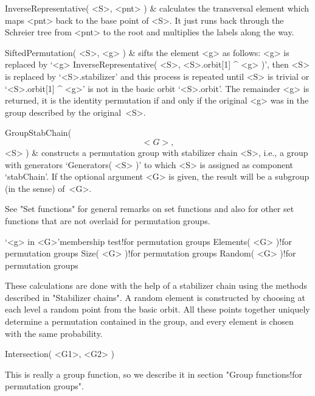 \function InverseRepresentative( <S>, <pnt> ) &
        calculates the transversal element which  maps <pnt> back to  the
        base point of  <S>. It just  runs back through the  Schreier tree
        from <pnt> to the root and multiplies the labels along the way.

\function SiftedPermutation( <S>, <g> ) &
        sifts  the element  <g> as  follows: <g>  is replaced by  `<g> \*
        InverseRepresentative(  <S>, <S>.orbit[1] ^   <g> )', then <S> is
        replaced by `<S>.stabilizer' and  this process is repeated  until
        <S> is trivial or `<S>.orbit[1] ^ <g>' is  not in the basic orbit
        `<S>.orbit'.  The remainder <g>  is returned, it  is the identity
        permutation if  and  only if the  original <g>  was in  the group
        described by the original~<S>.

\function GroupStabChain( \[ <G>, \] <S> ) &
        constructs a permutation group with stabilizer chain <S>, i.e., a
        group    with  generators `Generators( <S>  )'   to  which <S> is
        assigned as component  `stabChain'. If the  optional argument <G>
        is  given, the result  will be  a subgroup (in  the {\GAP} sense)
        of~<G>.
\enditems


See "Set functions" for  general remarks on   set functions and  also for
other set functions that are not overlaid for permutation groups.

\>`<g> in <G>'{membership test}!{for permutation groups}
\>Elements( <G> )!{for permutation groups}
\>Size( <G> )!{for permutation groups}
\>Random( <G> )!{for permutation groups}

These calculations are done with the help of a stabilizer chain using the
methods described in "Stabilizer chains". A random element is constructed
by choosing at each level a random point from  the basic orbit. All these
points together uniquely determine a permutation  contained in the group,
and every element is chosen with the same probability.

\)\fmark Intersection( <G1>, <G2> )

This is really  a  group function,  so we describe  it in  section "Group
functions!for permutation groups".


